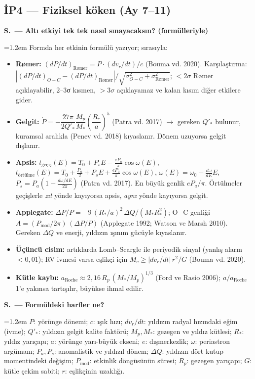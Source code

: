 \documentclass[11pt,a4paper]{article}
\newcounter{sor}[section]
\newcommand{\SC}[2]{\stepcounter{sor}\par\noindent\textbf{S\thesection.\thesor\ — #1}\par\nopagebreak
  \noindent\hangindent=1.2em\hangafter=0 #2\par\vspace{0.35em}}
\newcommand{\OC}{O$-$C}
\begin{document}
\subsection{İP4 — Fiziksel köken (Ay 7--11)}
\SC{Altı etkiyi tek tek nasıl sınayacaksın? (formülleriyle)}{Formda her etkinin formülü yazıyor; sırasıyla:
\begin{itemize}[leftmargin=1.2em]
\item \textbf{Rømer:} $(dP/dt)_\text{Rømer} = P\cdot(dv_r/dt)/c$ (Bouma vd. 2020). Karşılaştırma: $|(dP/dt)_{O-C}-(dP/dt)_\text{Rømer}|/\sqrt{\sigma_{O-C}^2+\sigma_\text{Rømer}^2}$; $<2\sigma$ Rømer açıklayabilir, 2--3σ kısmen, $>3\sigma$ açıklayamaz ve kalan kısım diğer etkilere gider.
\item \textbf{Gelgit:} $\dot P = -\dfrac{27\pi}{2Q'_*}\dfrac{M_p}{M_*}\left(\dfrac{R_*}{a}\right)^5$ (Patra vd. 2017) $\rightarrow$ gereken $Q'_*$ bulunur, kuramsal aralıkla (Penev vd. 2018) kıyaslanır. Dönem uzuyorsa gelgit dışlanır.
\item \textbf{Apsis:} $t_\text{geçiş}(E)=T_0+P_sE-\frac{eP_a}{\pi}\cos\omega(E)$, $t_\text{örtülme}(E)=T_0+\frac{P_a}{2}+P_sE+\frac{eP_a}{\pi}\cos\omega(E)$, $\omega(E)=\omega_0+\frac{d\omega}{dE}E$, $P_s=P_a\left(1-\frac{d\omega/dE}{2\pi}\right)$ (Patra vd. 2017). En büyük genlik $eP_a/\pi$. Örtülmeler geçişlerle \emph{zıt} yönde kayıyorsa apsis, \emph{aynı} yönde kayıyorsa gelgit.
\item \textbf{Applegate:} $\Delta P/P = -9\,(R_*/a)^2\,\Delta Q/(M_*R_*^2)$; \OC{} genliği $A=(P_\text{mod}/2\pi)\,(\Delta P/P)$ (Applegate 1992; Watson ve Marsh 2010). Gereken $\Delta Q$ ve enerji, yıldızın ışınım gücüyle kıyaslanır.
\item \textbf{Üçüncü cisim:} artıklarda Lomb--Scargle ile periyodik sinyal (yanlış alarm $<0{,}01$); RV ivmesi varsa eşlikçi için $M_c \geq |dv_r/dt|\,r^2/G$ (Bouma vd. 2020).
\item \textbf{Kütle kaybı:} $a_\text{Roche}\approx 2{,}16\,R_p\,(M_*/M_p)^{1/3}$ (Ford ve Rasio 2006); $a/a_\text{Roche}$ 1'e yakınsa tartışılır, büyükse ihmal edilir.
\end{itemize}}
\SC{Formüldeki harfler ne?}{$P$: yörünge dönemi; $c$: ışık hızı; $dv_r/dt$: yıldızın radyal hızındaki eğim (ivme); $Q'_*$: yıldızın gelgit kalite faktörü; $M_p, M_*$: gezegen ve yıldız kütlesi; $R_*$: yıldız yarıçapı; $a$: yörünge yarı-büyük ekseni; $e$: dışmerkezlik; $\omega$: periastron argümanı; $P_a, P_s$: anomalistik ve yıldızıl dönem; $\Delta Q$: yıldızın dört kutup momentindeki değişim; $P_\text{mod}$: etkinlik döngüsünün süresi; $R_p$: gezegen yarıçapı; $G$: kütle çekim sabiti; $r$: eşlikçinin uzaklığı.}
\end{document}
